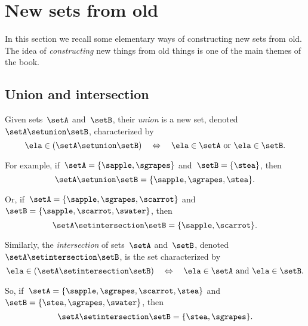 
\section{New sets from old}

In this section we recall some elementary ways of constructing new sets from old.
% 
The idea of \emph{constructing} new things from old things is one of the main themes of the book.

\subsection{Union and intersection}

Given sets~$\setA$ and~$\setB$, their \emph{union} is a new set, denoted~$\setA \setunion \setB$, characterized by
\begin{equation*}
    \ela \in (\setA \setunion \setB) \quad \Leftrightarrow \quad \ela \in \setA \ \text{or} \ \ela \in \setB.
\end{equation*}

For example, if~$\setA = \{ \sapple, \sgrapes \}$ and~$\setB = \{ \stea \}$, then
\begin{equation*}
    \setA \setunion \setB = \{ \sapple, \sgrapes, \stea \}.
\end{equation*}

Or, if~$\setA = \{ \sapple, \sgrapes, \scarrot \}$ and~$\setB = \{ \sapple, \scarrot, \swater \}$, then
\begin{equation*}
    \setA \setintersection \setB = \{ \sapple, \scarrot \}.
\end{equation*}

Similarly, the \emph{intersection} of sets~$\setA$ and~$\setB$, denoted~$\setA \setintersection \setB$, is the set characterized by
\begin{equation*}
    \ela \in (\setA \setintersection \setB) \quad \Leftrightarrow \quad \ela \in \setA \ \text{and} \ \ela \in \setB.
\end{equation*}

So, if~$\setA = \{ \sapple, \sgrapes, \scarrot, \stea \}$ and~$\setB = \{ \stea, \sgrapes, \swater \}$, then
\begin{equation*}
    \setA \setintersection \setB = \{ \stea, \sgrapes \}.
\end{equation*}


